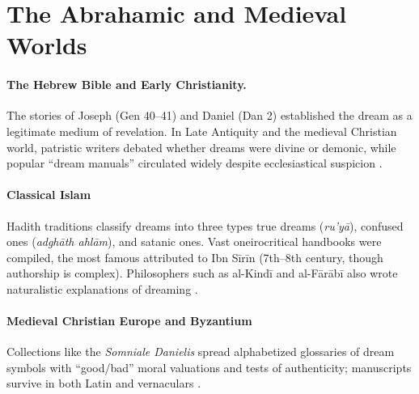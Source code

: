 \section{The Abrahamic and Medieval Worlds}\label{sec:abrahamic}

\paragraph{The Hebrew Bible and Early Christianity.}
The stories of Joseph (Gen 40–41) and Daniel (Dan 2) established the dream as a legitimate medium of revelation.  
In Late Antiquity and the medieval Christian world, patristic writers debated whether dreams were divine or demonic, while popular “dream manuals” circulated widely despite ecclesiastical suspicion \citep{miller1994lateantiquity}.

\paragraph{Classical Islam}
Hadith traditions classify dreams into three types \- true dreams (\textit{ru’yā}), confused ones (\textit{adghāth ahlām}), and satanic ones.  
Vast oneirocritical handbooks were compiled, the most famous attributed to Ibn Sīrīn (7th–8th century, though authorship is complex).  
Philosophers such as al-Kindī and al-Fārābī also wrote naturalistic explanations of dreaming \citep{sirr2000islam,ibnsirin2007}.

\paragraph{Medieval Christian Europe and Byzantium}
Collections like the \textit{Somniale Danielis} spread alphabetized glossaries of dream symbols with “good/bad” moral valuations and tests of authenticity; manuscripts survive in both Latin and vernaculars \citep{cappozzo2018somniale}.